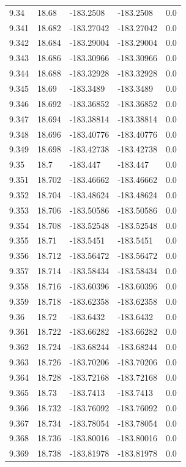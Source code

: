 \begin{tabular}{lllll}
9.34 & 18.68 & -183.2508 & -183.2508 & 0.0 \\
9.341 & 18.682 & -183.27042 & -183.27042 & 0.0 \\
9.342 & 18.684 & -183.29004 & -183.29004 & 0.0 \\
9.343 & 18.686 & -183.30966 & -183.30966 & 0.0 \\
9.344 & 18.688 & -183.32928 & -183.32928 & 0.0 \\
9.345 & 18.69 & -183.3489 & -183.3489 & 0.0 \\
9.346 & 18.692 & -183.36852 & -183.36852 & 0.0 \\
9.347 & 18.694 & -183.38814 & -183.38814 & 0.0 \\
9.348 & 18.696 & -183.40776 & -183.40776 & 0.0 \\
9.349 & 18.698 & -183.42738 & -183.42738 & 0.0 \\
9.35 & 18.7 & -183.447 & -183.447 & 0.0 \\
9.351 & 18.702 & -183.46662 & -183.46662 & 0.0 \\
9.352 & 18.704 & -183.48624 & -183.48624 & 0.0 \\
9.353 & 18.706 & -183.50586 & -183.50586 & 0.0 \\
9.354 & 18.708 & -183.52548 & -183.52548 & 0.0 \\
9.355 & 18.71 & -183.5451 & -183.5451 & 0.0 \\
9.356 & 18.712 & -183.56472 & -183.56472 & 0.0 \\
9.357 & 18.714 & -183.58434 & -183.58434 & 0.0 \\
9.358 & 18.716 & -183.60396 & -183.60396 & 0.0 \\
9.359 & 18.718 & -183.62358 & -183.62358 & 0.0 \\
9.36 & 18.72 & -183.6432 & -183.6432 & 0.0 \\
9.361 & 18.722 & -183.66282 & -183.66282 & 0.0 \\
9.362 & 18.724 & -183.68244 & -183.68244 & 0.0 \\
9.363 & 18.726 & -183.70206 & -183.70206 & 0.0 \\
9.364 & 18.728 & -183.72168 & -183.72168 & 0.0 \\
9.365 & 18.73 & -183.7413 & -183.7413 & 0.0 \\
9.366 & 18.732 & -183.76092 & -183.76092 & 0.0 \\
9.367 & 18.734 & -183.78054 & -183.78054 & 0.0 \\
9.368 & 18.736 & -183.80016 & -183.80016 & 0.0 \\
9.369 & 18.738 & -183.81978 & -183.81978 & 0.0 \\

\end{tabular}
